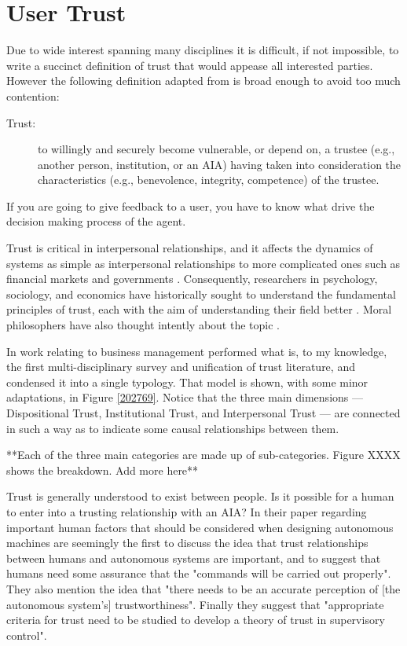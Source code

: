 \section{User Trust}
    Due to wide interest spanning many disciplines it is difficult, if not impossible, to write a succinct definition of trust that would appease all interested parties. However the following definition adapted from \cite{Harrison_McKnight2004-vv} is broad enough to avoid too much contention:

    \begin{description}
        \item [Trust:] to willingly and securely become vulnerable, or depend on, a trustee (e.g., another person, institution, or an AIA) having taken into consideration the characteristics (e.g., benevolence,  integrity,  competence)  of  the  trustee.
    \end{description}

    If you are going to give feedback to a user, you have to know what drive the decision making process of the agent.

    Trust is critical in interpersonal relationships, and it affects the dynamics of systems as simple as interpersonal relationships to more complicated ones such as financial markets and governments \cite{Fukuyama1995-un}. Consequently, researchers in psychology, sociology, and economics have historically sought to understand the fundamental principles of trust, each with the aim of understanding their field better \cite{Gambetta1988-pi}. Moral philosophers have also thought intently about the topic \cite{Baier1986-im}.

    In work relating to business management \cite{D_Harrison_Mcknight1996-ng,McKnight1998-ty} performed what is, to my knowledge, the first multi-disciplinary survey  and unification of trust literature, and condensed it into a single typology. That model is shown, with some minor adaptations, in Figure \ref{202769}. Notice that the three main dimensions --- Dispositional Trust, Institutional Trust, and Interpersonal Trust --- are connected in such a way as to indicate some causal relationships between them.

    **Each of the three main categories are made up of sub-categories. Figure XXXX shows the breakdown. Add more here**

    Trust is generally understood to exist between people. Is it possible for a human to enter into a trusting relationship with an AIA? In their paper regarding important human factors that should be considered when designing autonomous machines \cite{Sheridan1984-kx} are seemingly the first to discuss the idea that trust relationships between humans and autonomous systems are important, and to suggest that humans need some assurance that the "commands will be carried out properly". They also mention the idea that "there needs to be an accurate perception of [the autonomous system's] trustworthiness". Finally they suggest that "appropriate criteria for trust need to be studied to develop a theory of trust in supervisory control".

